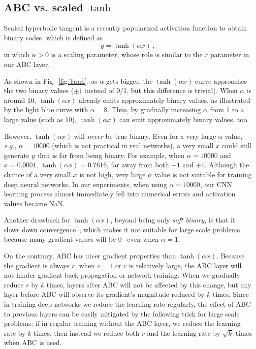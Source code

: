 \documentclass[runningheads]{llncs}
\begin{document}
\subsection{ABC vs. scaled $\tanh$}

Scaled hyperbolic tangent is a recently popularized activation function to obtain binary codes, which is defined as
\begin{equation}
y = \tanh(\alpha x) \,,
\end{equation}
in which $\alpha>0$ is a scaling parameter, whose role is similar to the $r$ parameter in our ABC layer.

As shown in Fig.~\ref{fig:Tanh}, as $\alpha$ gets bigger, the $\tanh(\alpha x)$ curve approaches the two binary values ($\pm 1$ instead of 0/1, but this difference is trivial). When $\alpha$ is around 10, $\tanh(\alpha x)$ already emits approximately binary values, as illustrated by the light blue curve with $\alpha=8$. Thus, by gradually increasing $\alpha$ from 1 to a large value (such as 10), $\tanh(\alpha x)$ can emit approximately binary values, too.

However, $\tanh(\alpha x)$ will \emph{never} be true binary. Even for a very large $\alpha$ value, \emph{e.g.}, $\alpha=10000$ (which is not practical in real networks), a very small $x$ could still generate $y$ that is far from being binary. For example, when $\alpha=10000$ and $x=0.0001$, $\tanh(\alpha x)=0.7616$, far away from both $-1$ and $+1$. Although the chance of a very small $x$ is not high, very large $\alpha$ value is not suitable for training deep neural networks. In our experiments, when using $\alpha=10000$, our CNN learning process almost immediately fell into numerical errors and activation values became NaN.

Another drawback for $\tanh(\alpha x)$, beyond being only \emph{soft binary}, is that it slows down convergence~\cite{Liu16CVPR_r12}, which makes it not suitable for large scale problems because many gradient values will be 0~\cite{ReLU} even when $\alpha=1$.

On the contrary, ABC has nicer gradient properties than $\tanh(\alpha x)$. Because the gradient is always $r$, when $r=1$ or $r$ is relatively large, the ABC layer will not hinder gradient back-propagation or network training. When we gradually reduce $r$ by $k$ times, layers after ABC will not be affected by this change, but any layer before ABC will observe its gradient's magnitude reduced by $k$ times. Since in training deep networks we reduce the learning rate regularly, the effect of ABC to previous layers can be easily mitigated by the following trick for large scale problems: if in regular training without the ABC layer, we reduce the learning rate by $k$ times, then instead we reduce both $r$ and the learning rate by $\sqrt{k}$ times when ABC is used.
\end{document}
